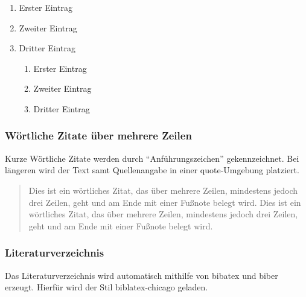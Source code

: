 \begin{enumerate}
	\item Erster Eintrag
	\item Zweiter Eintrag
	\item Dritter Eintrag
	\begin{enumerate}
		\item Erster Eintrag
		\item Zweiter Eintrag
		\item Dritter Eintrag
	\end{enumerate}
\end{enumerate}

\blindtext
\subsubsection{Wörtliche Zitate über mehrere Zeilen}

Kurze Wörtliche Zitate werden durch \enquote{Anführungszeichen} gekennzeichnet. Bei längeren wird der Text samt Quellenangabe in einer quote-Umgebung platziert.

\begin{quote}
	Dies ist ein wörtliches Zitat, das über mehrere Zeilen, mindestens jedoch drei
	Zeilen, geht und am Ende mit einer Fußnote belegt wird. Dies ist ein wörtliches
	Zitat, das über mehrere Zeilen, mindestens jedoch drei Zeilen, geht und am Ende
	mit einer Fußnote belegt wird.\autocite{test.2020}
\end{quote}

\subsubsection{Literaturverzeichnis}

Das Literaturverzeichnis wird automatisch mithilfe von bibatex und biber erzeugt. Hierfür wird der Stil biblatex-chicago geladen. 

